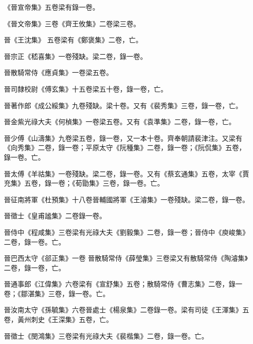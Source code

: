 \begin{pinyinscope}
 《晉宣帝集》五卷梁有錄一卷。



 《晉文帝集》三卷《齊王攸集》二卷梁三卷。



 晉《王沈集》
 五卷梁有《鄭褒集》二卷，亡。



 晉宗正《嵇喜集》一卷殘缺。梁二卷，錄一卷。



 晉散騎常侍《應貞集》一卷梁五卷。



 晉司隸校尉《傅玄集》十五卷梁五十卷，錄一卷，亡。



 晉著作郎《成公綏集》九卷殘缺。梁十卷。又有《裴秀集》三卷，錄一卷，亡。



 晉金紫光祿大夫《何楨集》一卷梁五卷。又有《袁準集》二卷，錄一卷，亡。



 晉少傅《山濤集》九卷梁五卷，錄一卷，又一本十卷。齊奉朝請裴津注。又梁有《向秀集》二卷，錄一卷；平原太守《阮種集》二卷，錄一卷；《阮侃集》五卷，錄一卷。亡。



 晉太傅《羊祜集》一卷殘缺。梁二卷，錄一卷。又有《蔡玄通集》五卷，太宰《賈充集》五卷，錄一卷；《荀勖集》三卷，錄一卷。亡。



 晉征南將軍《杜預集》十八卷晉輔國將軍《王濬集》一卷殘缺。梁二卷，錄一卷。



 晉徵士《皇甫謐集》二卷錄一卷。



 晉侍中《程咸集》三卷梁有光祿大夫《劉毅集》二卷，錄一卷；晉侍中《庾峻集》二卷，錄一卷。亡。



 晉巴西太守《郤正集》一卷
 晉散騎常侍《薛瑩集》三卷梁又有散騎常侍《陶濬集》二卷，錄一卷，亡。



 晉通事郎《江偉集》六卷梁有《宣舒集》五卷；散騎常侍《曹志集》二卷，錄一卷；《鄒湛集》三卷，錄一卷。亡。



 晉汝南太守《孫毓集》六卷晉處士《楊泉集》二卷錄一卷。梁有司徒《王渾集》五卷，黃州刺史《王深集》五卷，亡。



 晉徵士《閔鴻集》三卷梁有光祿大夫《裴楷集》二卷，錄一卷。亡。




\end{pinyinscope}
